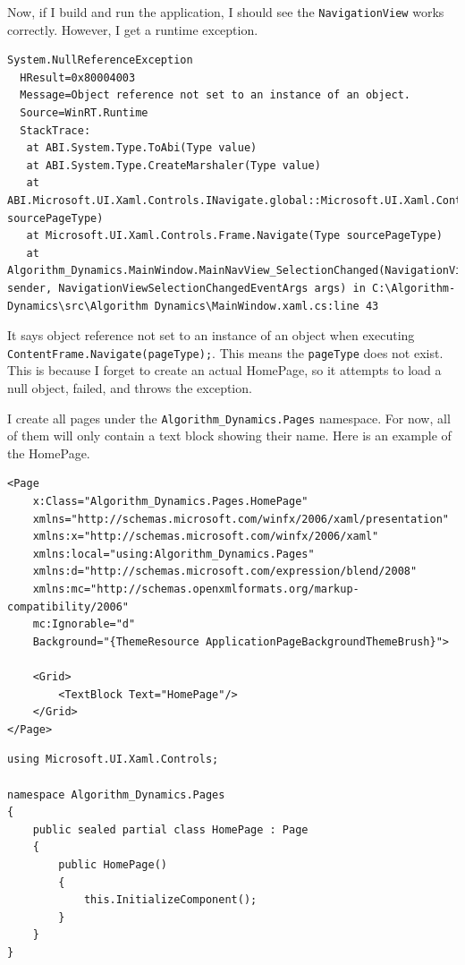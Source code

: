 \documentclass[a4paper]{report}
\newcommand{\code}{\texttt}
\begin{document}
Now, if I build and run the application, I should see the \code{NavigationView} works correctly. However, I get a runtime exception.

\begin{verbatim}
System.NullReferenceException
  HResult=0x80004003
  Message=Object reference not set to an instance of an object.
  Source=WinRT.Runtime
  StackTrace:
   at ABI.System.Type.ToAbi(Type value)
   at ABI.System.Type.CreateMarshaler(Type value)
   at ABI.Microsoft.UI.Xaml.Controls.INavigate.global::Microsoft.UI.Xaml.Controls.INavigate.Navigate(Type sourcePageType)
   at Microsoft.UI.Xaml.Controls.Frame.Navigate(Type sourcePageType)
   at Algorithm_Dynamics.MainWindow.MainNavView_SelectionChanged(NavigationView sender, NavigationViewSelectionChangedEventArgs args) in C:\Algorithm-Dynamics\src\Algorithm Dynamics\MainWindow.xaml.cs:line 43
\end{verbatim}


It says object reference not set to an instance of an object when executing \code{ContentFrame.Navigate(pageType);}. This means the \code{pageType} does not exist. This is because I forget to create an actual HomePage, so it attempts to load a null object, failed, and throws the exception.  

I create all pages under the \code{Algorithm_Dynamics.Pages} namespace. For now, all of them will only contain a text block showing their name. Here is an example of the HomePage.

\begin{verbatim}
<Page
    x:Class="Algorithm_Dynamics.Pages.HomePage"
    xmlns="http://schemas.microsoft.com/winfx/2006/xaml/presentation"
    xmlns:x="http://schemas.microsoft.com/winfx/2006/xaml"
    xmlns:local="using:Algorithm_Dynamics.Pages"
    xmlns:d="http://schemas.microsoft.com/expression/blend/2008"
    xmlns:mc="http://schemas.openxmlformats.org/markup-compatibility/2006"
    mc:Ignorable="d"
    Background="{ThemeResource ApplicationPageBackgroundThemeBrush}">

    <Grid>
        <TextBlock Text="HomePage"/>
    </Grid>
</Page>
\end{verbatim}


\begin{verbatim}
using Microsoft.UI.Xaml.Controls;

namespace Algorithm_Dynamics.Pages
{
    public sealed partial class HomePage : Page
    {
        public HomePage()
        {
            this.InitializeComponent();
        }
    }
}
\end{verbatim}
\end{document}
